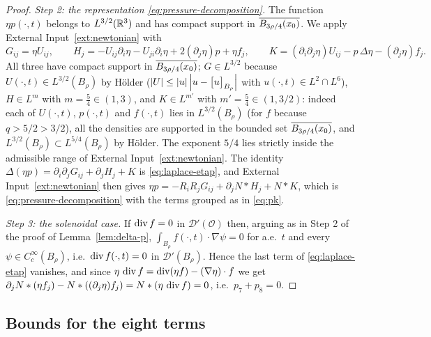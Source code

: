 \documentclass[11pt,reqno]{amsart}
\begin{document}
\begin{proof}
\emph{Step 2: the representation \eqref{eq:pressure-decomposition}.} The
function $\eta p(\cdot,t)$ belongs to $L^{3/2}(\mathbb{R}^{3})$ and has compact support
in $\overline{B_{3\rho/4}(x_{0})}$. We apply
External Input~\ref{ext:newtonian} with
\[
  G_{ij}=\eta U_{ij},\qquad
  H_{j}=-U_{ij}\partial_{i}\eta-U_{ji}\partial_{i}\eta+2(\partial_{j}\eta)p+\eta f_{j},
  \qquad
  K=(\partial_{i}\partial_{j}\eta)U_{ij}-p\,\Delta\eta-(\partial_{j}\eta)f_{j}.
\]
All three have compact support in $\overline{B_{3\rho/4}(x_{0})}$;
$G\in L^{3/2}$ because $U(\cdot,t)\in L^{3/2}(B_{\rho})$ by H\"older
($\left\lvert U \right\rvert\le\left\lvert u \right\rvert\left\lvert u-\bigl[u\bigr]_{B_{\rho}} \right\rvert$ with $u(\cdot,t)\in L^{2}\cap L^{6}$),
$H\in L^{m}$ with $m=\tfrac54\in(1,3)$, and $K\in L^{m'}$ with $m'=\tfrac54\in(1,3/2)$:
indeed each of $U(\cdot,t)$, $p(\cdot,t)$ and $f(\cdot,t)$ lies in
$L^{3/2}(B_{\rho})$ (for $f$ because $q>5/2>3/2$), all the densities are
supported in the bounded set $\overline{B_{3\rho/4}(x_{0})}$, and
$L^{3/2}(B_{\rho})\subset L^{5/4}(B_{\rho})$ by H\"older. The exponent $5/4$
lies strictly inside the admissible range of
External Input~\ref{ext:newtonian}. The identity $\Delta(\eta p)=\partial_{i}\partial_{j}G_{ij}
+\partial_{j}H_{j}+K$ is \eqref{eq:laplace-etap}, and
External Input~\ref{ext:newtonian} then gives
$\eta p=-R_{i}R_{j}G_{ij}+\partial_{j}N*H_{j}+N*K$, which is
\eqref{eq:pressure-decomposition} with the terms grouped as in \eqref{eq:pk}.

\emph{Step 3: the solenoidal case.} If $\operatorname{div} f=0$ in
$\mathcal{D}'(\mathcal{O})$ then, arguing as in Step 2 of the proof of
Lemma~\ref{lem:delta-p}, $\int_{B_{\rho}}f(\cdot,t)\cdot\nabla\psi=0$ for a.e.\
$t$ and every $\psi\in C_{c}^{\infty}(B_{\rho})$, i.e.\ $\operatorname{div} f(\cdot,t)=0$ in
$\mathcal{D}'(B_{\rho})$. Hence the last term of \eqref{eq:laplace-etap}
vanishes, and since
$\eta\,\operatorname{div} f=\operatorname{div}(\eta f)-(\nabla\eta)\cdot f$ we get
$\partial_{j}N*(\eta f_{j})-N*((\partial_{j}\eta)f_{j})=N*(\eta\,\operatorname{div} f)=0$, i.e.\
$p_{7}+p_{8}=0$.
\end{proof}

\subsection{Bounds for the eight terms}\label{ss:pressure-bounds}
\end{document}
